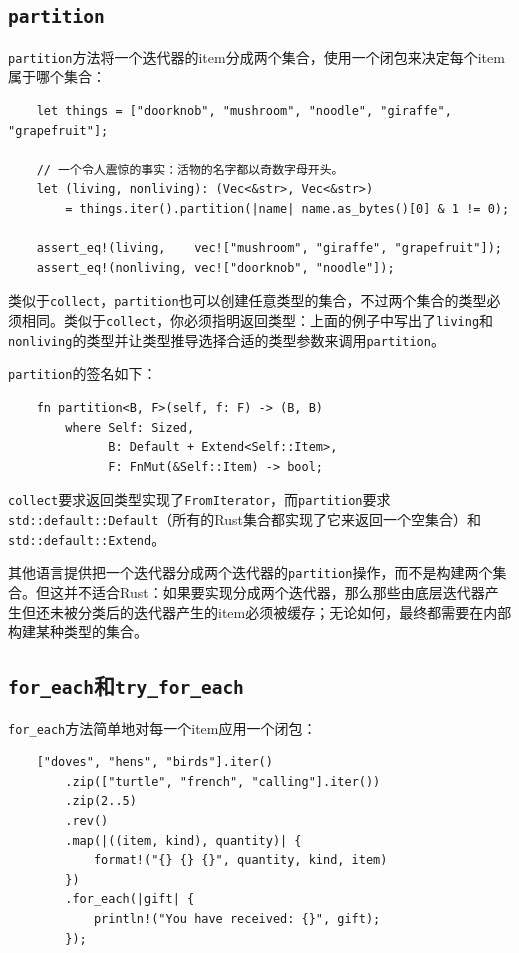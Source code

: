 \subsection{\texttt{partition}}
\texttt{partition}方法将一个迭代器的item分成两个集合，使用一个闭包来决定每个item属于哪个集合：
\begin{verbatim}
    let things = ["doorknob", "mushroom", "noodle", "giraffe", "grapefruit"];

    // 一个令人震惊的事实：活物的名字都以奇数字母开头。
    let (living, nonliving): (Vec<&str>, Vec<&str>)
        = things.iter().partition(|name| name.as_bytes()[0] & 1 != 0);
    
    assert_eq!(living,    vec!["mushroom", "giraffe", "grapefruit"]);
    assert_eq!(nonliving, vec!["doorknob", "noodle"]);
\end{verbatim}

类似于\texttt{collect}，\texttt{partition}也可以创建任意类型的集合，不过两个集合的类型必须相同。类似于\texttt{collect}，你必须指明返回类型：上面的例子中写出了\texttt{living}和\texttt{nonliving}的类型并让类型推导选择合适的类型参数来调用\texttt{partition}。

\texttt{partition}的签名如下：
\begin{verbatim}
    fn partition<B, F>(self, f: F) -> (B, B)
        where Self: Sized,
              B: Default + Extend<Self::Item>,
              F: FnMut(&Self::Item) -> bool;
\end{verbatim}
\texttt{collect}要求返回类型实现了\texttt{FromIterator}，而\texttt{partition}要求\texttt{std::default::Default}（所有的Rust集合都实现了它来返回一个空集合）和\texttt{std::default::Extend}。

其他语言提供把一个迭代器分成两个迭代器的\texttt{partition}操作，而不是构建两个集合。但这并不适合Rust：如果要实现分成两个迭代器，那么那些由底层迭代器产生但还未被分类后的迭代器产生的item必须被缓存；无论如何，最终都需要在内部构建某种类型的集合。

\subsection{\texttt{for\_each}和\texttt{try\_for\_each}}
\texttt{for\_each}方法简单地对每一个item应用一个闭包：
\begin{verbatim}
    ["doves", "hens", "birds"].iter()
        .zip(["turtle", "french", "calling"].iter())
        .zip(2..5)
        .rev()
        .map(|((item, kind), quantity)| {
            format!("{} {} {}", quantity, kind, item)
        })
        .for_each(|gift| {
            println!("You have received: {}", gift);
        });
\end{verbatim}

